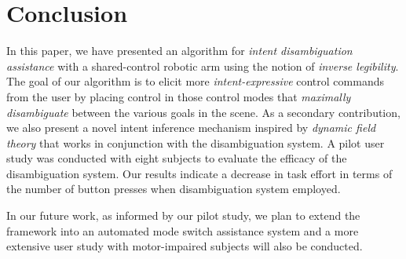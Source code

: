 \documentclass[journal]{IEEEtran}
\begin{document}

\section{Conclusion}\label{sec:conclusions}
In this paper, we have presented an algorithm for \textit{intent disambiguation assistance} with a shared-control robotic arm using the notion of \textit{inverse legibility}. The goal of our algorithm is to elicit more \textit{intent-expressive} control commands from the user by placing control in those control modes that \textit{maximally disambiguate} between the various goals in the scene. As a secondary contribution, we also present a novel intent inference mechanism inspired by \textit{dynamic field theory} that works in conjunction with the disambiguation system. A pilot user study was conducted with eight subjects to evaluate the efficacy of the disambiguation system. Our results indicate a decrease in task effort in terms of the number of button presses when disambiguation system employed. 

In our future work, as informed by our pilot study, we plan to extend the framework into an automated mode switch assistance system and  a more extensive user study with motor-impaired subjects will also be conducted.
%
%
%
%
\end{document}
